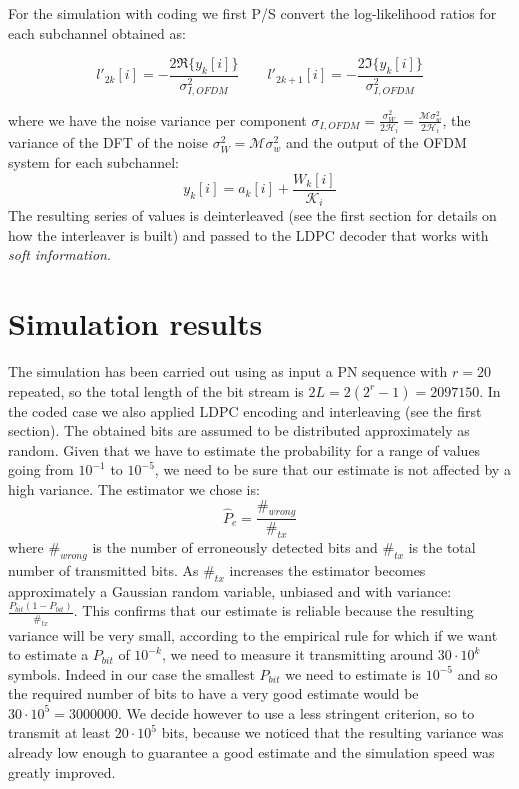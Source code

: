 \documentclass[a4paper,11.5pt]{article}
\begin{document}
For the simulation with coding we first P/S convert the log-likelihood ratios for each subchannel obtained as:

\begin{equation}
l'_{2k}[i] =- \frac{2 \Re\{y_k[i]\}}{\sigma_{I,OFDM}^2} \quad \quad
l'_{2k+1}[i]= - \frac{2 \Im\{y_k[i]\}}{\sigma_{I,OFDM}^2}
\end{equation}

where we have the noise variance per component $\sigma_{I,OFDM} = \frac{\sigma_W^2}{2 \mathcal{H}_i}=\frac{\mathcal{M} \sigma_w^2}{2 \mathcal{H}_i}$, the variance of the DFT of the noise $\sigma_W^2 = \mathcal{M} \sigma_w^2$ and the output of the OFDM system for each subchannel:
\begin{equation} \label{eq:outOFDM}
 y_k[i] = a_k[i] + \frac{W_k[i]}{\mathcal{K}_i}
\end{equation}
 The resulting series of values is deinterleaved (see the first section for details on how the interleaver is built) and passed to the LDPC decoder that works with \emph{soft information}.

\section*{Simulation results}

The simulation has been carried out using as input a PN sequence with $r=20$ repeated, so the total length of the bit stream is $2L = 2(2^r-1) = 2097150$. In the coded case we also applied LDPC encoding and interleaving (see the first section). The obtained bits are assumed to be distributed approximately as random. Given that we have to estimate the probability for a range of values going from $10^{-1}$ to $10^{-5}$, we need to be sure that our estimate is not affected by a high variance. The estimator we chose is:
\begin{equation}
\hat{P}_e = \frac{\#_{wrong}}{\#_{tx}}
\end{equation}
where $\#_{wrong}$ is the number of erroneously detected bits and $\#_{tx}$ is the total number of transmitted bits. As $\#_{tx}$ increases the estimator becomes approximately a Gaussian random variable, unbiased and with variance: $\frac{P_{bit} (1-P_{bit})}{\#_{tx}}$. This confirms that our estimate is reliable because the resulting variance will be very small, according to the empirical rule for which if we want to estimate a $P_{bit}$ of $10^{-k}$, we need to measure it transmitting around $30\cdot 10^{k}$ symbols. Indeed in our case the smallest $P_{bit}$ we need to estimate is $10^{-5}$ and so the required number of bits to have a very good estimate would be $30\cdot 10^{5}= 3000000$. We decide however to use a less stringent criterion, so to transmit at least $20\cdot 10^5$ bits, because we noticed that the resulting variance was already low enough to guarantee a good estimate and the simulation speed was greatly improved.
\end{document}
